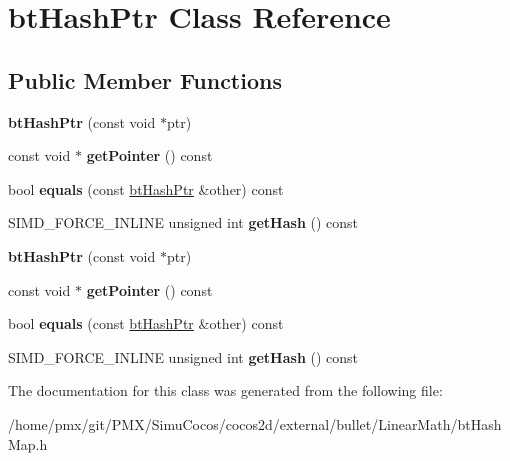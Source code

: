 \hypertarget{classbtHashPtr}{}\section{bt\+Hash\+Ptr Class Reference}
\label{classbtHashPtr}
\subsection*{Public Member Functions}
\begin{DoxyCompactItemize}
\item 
\mbox{\label{classbtHashPtr_a15f7d80f635d14c1885bfe90e3154642}} 
{\bfseries bt\+Hash\+Ptr} (const void $\ast$ptr)
\item 
\mbox{\label{classbtHashPtr_abaa9e6f1c1f612dc91ba8475ed857ccf}} 
const void $\ast$ {\bfseries get\+Pointer} () const
\item 
\mbox{\label{classbtHashPtr_a6bd218e4ca2c709481f40ac842cd5bb8}} 
bool {\bfseries equals} (const \hyperlink{classbtHashPtr}{bt\+Hash\+Ptr} \&other) const
\item 
\mbox{\label{classbtHashPtr_a43838f4e2312bf67eceb8c8b25cb1fd2}} 
S\+I\+M\+D\+\_\+\+F\+O\+R\+C\+E\+\_\+\+I\+N\+L\+I\+NE unsigned int {\bfseries get\+Hash} () const
\item 
\mbox{\label{classbtHashPtr_a15f7d80f635d14c1885bfe90e3154642}} 
{\bfseries bt\+Hash\+Ptr} (const void $\ast$ptr)
\item 
\mbox{\label{classbtHashPtr_abaa9e6f1c1f612dc91ba8475ed857ccf}} 
const void $\ast$ {\bfseries get\+Pointer} () const
\item 
\mbox{\label{classbtHashPtr_a6bd218e4ca2c709481f40ac842cd5bb8}} 
bool {\bfseries equals} (const \hyperlink{classbtHashPtr}{bt\+Hash\+Ptr} \&other) const
\item 
\mbox{\label{classbtHashPtr_a43838f4e2312bf67eceb8c8b25cb1fd2}} 
S\+I\+M\+D\+\_\+\+F\+O\+R\+C\+E\+\_\+\+I\+N\+L\+I\+NE unsigned int {\bfseries get\+Hash} () const
\end{DoxyCompactItemize}


The documentation for this class was generated from the following file\+:\begin{DoxyCompactItemize}
\item 
/home/pmx/git/\+P\+M\+X/\+Simu\+Cocos/cocos2d/external/bullet/\+Linear\+Math/bt\+Hash\+Map.\+h\end{DoxyCompactItemize}
